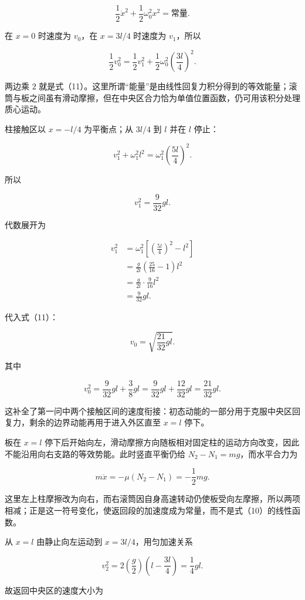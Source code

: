 \documentclass[12pt,a4paper,UTF8]{ctexart}
\begin{document}
\[
\frac12\dot x^2+\frac12\omega_0^2x^2=\text{常量}.
\]

在 \(x=0\) 时速度为 \(v_0\)，在 \(x=3l/4\) 时速度为 \(v_1\)，所以

\[
\frac12v_0^2
=\frac12v_1^2
+\frac12\omega_0^2\left(\frac{3l}{4}\right)^2.
\]

两边乘 \(2\)
就是式（11）。这里所谓``能量''是由线性回复力积分得到的等效能量；滚筒与板之间虽有滑动摩擦，但在中央区合力恰为单值位置函数，仍可用该积分处理质心运动。

柱接触区以 \(x=-l/4\) 为平衡点；从 \(3l/4\) 到 \(l\) 并在 \(l\) 停止：

\[
v_1^2+\omega_1^2l^2
=\omega_1^2\left(\frac{5l}{4}\right)^2.
\tag{12}
\]

所以

\[
v_1^2=\frac{9}{32}gl.
\tag{13}
\]

代数展开为

\[
\begin{aligned}
v_1^2
&=\omega_1^2
\left[\left(\frac{5l}{4}\right)^2-l^2\right]\\
&=\frac g{2l}\left(\frac{25}{16}-1\right)l^2\\
&=\frac g{2l}\cdot\frac9{16}l^2\\
&=\frac9{32}gl.
\end{aligned}
\]

代入式（11）：

\[
\boxed{
v_0=\sqrt{\frac{21}{32}gl}
}.
\tag{14}
\]

其中

\[
v_0^2
=\frac9{32}gl+\frac38gl
=\frac9{32}gl+\frac{12}{32}gl
=\frac{21}{32}gl.
\]

这补全了第一问中两个接触区间的速度衔接：初态动能的一部分用于克服中央区回复力，剩余的边界动能再用于进入外区直至
\(x=l\) 停下。

板在 \(x=l\)
停下后开始向左，滑动摩擦方向随板相对固定柱的运动方向改变，因此不能沿用向右支路的等效势能。此时竖直平衡仍给
\(N_2-N_1=mg\)，而水平合力为

\[
m\ddot x=-\mu(N_2-N_1)=-\frac12mg.
\tag{15}
\]

这里左上柱摩擦改为向右，而右滚筒因自身高速转动仍使板受向左摩擦，所以两项相减；正是这一符号变化，使返回段的加速度成为常量，而不是式（10）的线性函数。

从 \(x=l\) 由静止向左运动到 \(x=3l/4\)，用匀加速关系

\[
v_2^2=2\left(\frac g2\right)\left(l-\frac{3l}{4}\right)
=\frac14gl.
\tag{16}
\]

故返回中央区的速度大小为
\end{document}

